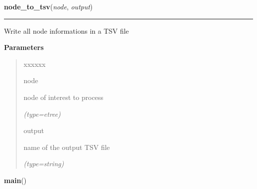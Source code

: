     \vspace{0.5ex}

\hspace{.8\funcindent}\begin{boxedminipage}{\funcwidth}

    \raggedright \textbf{node\_to\_tsv}(\textit{node}, \textit{output})

    \vspace{-1.5ex}

    \rule{\textwidth}{0.5\fboxrule}
\setlength{\parskip}{2ex}
    Write all node informations in a TSV file

\setlength{\parskip}{1ex}
      \textbf{Parameters}
      \vspace{-1ex}

      \begin{quote}
        \begin{Ventry}{xxxxxx}

          \item[node]

          node of interest to process

            {\it (type=etree)}

          \item[output]

          name of the output TSV file

            {\it (type=string)}

        \end{Ventry}

      \end{quote}

    \end{boxedminipage}

    \label{script-XMLtoTSV:main}

    \vspace{0.5ex}

\hspace{.8\funcindent}\begin{boxedminipage}{\funcwidth}

    \raggedright \textbf{main}()

\setlength{\parskip}{2ex}
\setlength{\parskip}{1ex}
    \end{boxedminipage}



